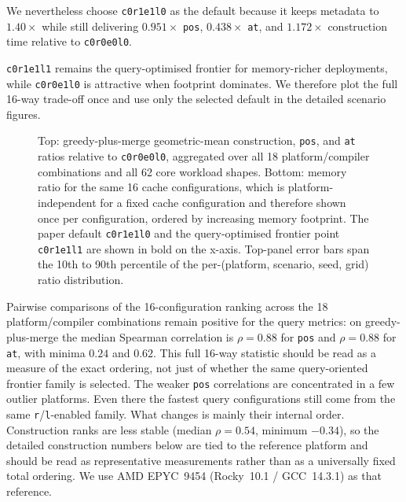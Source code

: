 \documentclass[manuscript,screen,review]{acmart}
\theoremstyle{definition}
\theoremstyle{plain}
\begin{document}
We
nevertheless choose \texttt{c0r1e1l0} as the default because it keeps
metadata to $1.40\times$ while still delivering $0.951\times$
\texttt{pos}, $0.438\times$ \texttt{at}, and $1.172\times$
construction time relative to \texttt{c0r0e0l0}.

\texttt{c0r1e1l1} remains the query-optimised frontier for
memory-richer deployments, while \texttt{c0r0e1l0} is attractive when
footprint dominates. We therefore plot the full 16-way trade-off once
and use only the selected default in the detailed scenario figures.

\begin{figure}
\centering

\caption{Top: greedy-plus-merge geometric-mean construction,
  \texttt{pos}, and \texttt{at} ratios relative to \texttt{c0r0e0l0},
  aggregated over all 18 platform/compiler combinations and all 62 core
  workload shapes. Bottom: memory ratio for the same 16 cache
  configurations, which is platform-independent for a fixed cache
  configuration and therefore shown once per configuration, ordered by
  increasing memory footprint. The paper default \texttt{c0r1e1l0} and
  the query-optimised frontier point \texttt{c0r1e1l1} are shown in
  bold on the x-axis. Top-panel error bars span the 10th to 90th
  percentile of the per-(platform, scenario, seed, grid) ratio
  distribution.}
\label{figure:at-cache}
\end{figure}

Pairwise comparisons of the 16-configuration ranking across the 18
platform/compiler combinations remain positive for the query metrics:
on greedy-plus-merge the median Spearman correlation is
$\rho = 0.88$ for \texttt{pos} and $\rho = 0.88$ for \texttt{at}, with
minima $0.24$ and $0.62$.
This full 16-way statistic should be read as a measure of the exact
ordering, not just of whether the same query-oriented frontier family is
selected.
The weaker \texttt{pos} correlations are concentrated in a few outlier
platforms.
Even there the fastest query configurations still come from
the same \texttt{r}/\texttt{l}-enabled family. What changes is mainly
their internal order.
Construction ranks are less stable (median $\rho = 0.54$,
minimum $-0.34$), so the detailed construction numbers below are tied
to the reference platform and should be read as representative
measurements rather than as a universally fixed total ordering.
We use AMD EPYC~9454 (Rocky~10.1 / GCC~14.3.1) as that reference.
\end{document}
